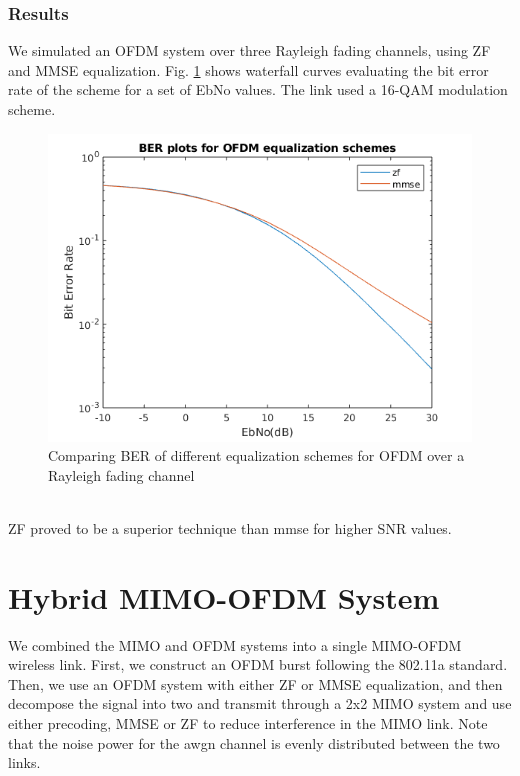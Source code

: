 \documentclass[conference]{IEEEtran}
\begin{document}
\subsubsection{Results}
We simulated an OFDM system over three Rayleigh fading channels, using ZF and MMSE equalization. Fig. \ref{fig:ofdm} shows waterfall curves evaluating the bit error rate of the scheme for a set of EbNo values. The link used a 16-QAM modulation scheme.
\begin{figure}[htbp]
\centerline{\includegraphics[scale=.4]{./media/ofdm_01.png}}
\caption{Comparing BER of different equalization schemes for OFDM over a Rayleigh fading channel}
\label{fig:ofdm}
\end{figure}\\ 
ZF proved to be a superior technique than mmse for higher SNR values. 
\section{Hybrid MIMO-OFDM System}
We combined the MIMO and OFDM systems into a single MIMO-OFDM wireless link. First, we construct an OFDM burst following the 802.11a standard. Then, we use an OFDM system with either ZF or MMSE equalization, and then decompose the signal into two and transmit through a 2x2 MIMO system and use either precoding, MMSE or ZF to reduce interference in the MIMO link. Note that the noise power for the awgn channel is evenly distributed between the two links. 
\end{document}
